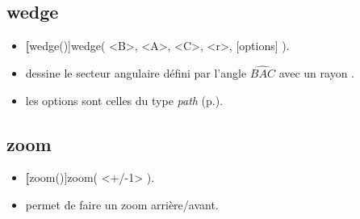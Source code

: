 \subsection{wedge}

\begin{itemize}
 \item \util \textbf[wedge()]{wedge( <B>, <A>, <C>, <r>, [options] )}.
 \item \desc dessine le secteur angulaire défini par l'angle $\widehat{BAC}$ avec un rayon .
 \item les options sont celles du type \emph{path} (p.\pageref{typepath}).
\end{itemize}

\subsection{zoom}

\begin{itemize}
 \item \util \textbf[zoom()]{zoom( <+/-1> )}.
 \item \desc permet de faire un zoom arrière/avant.
\end{itemize}
